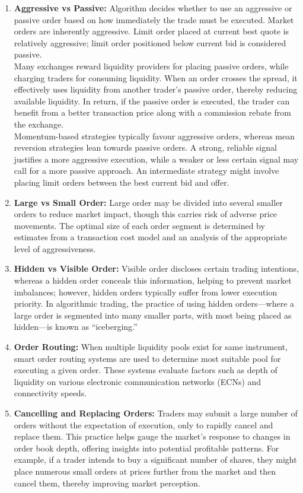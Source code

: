 \begin{remark} 
\begin{enumerate}[label=\roman*.] \setlength{\itemsep}{0pt}

\item \textbf{Aggressive vs Passive:} Algorithm decides whether to use an aggressive or passive order based on how immediately the trade must be executed. Market orders are inherently aggressive. Limit order placed at current best quote is relatively aggressive; limit order positioned below current bid is considered passive.\\
Many exchanges reward liquidity providers for placing passive orders, while charging traders for consuming liquidity. When an order crosses the spread, it effectively uses liquidity from another trader’s passive order, thereby reducing available liquidity. In return, if the passive order is executed, the trader can benefit from a better transaction price along with a commission rebate from the exchange.\\
Momentum-based strategies typically favour aggressive orders, whereas mean reversion strategies lean towards passive orders. A strong, reliable signal justifies a more aggressive execution, while a weaker or less certain signal may call for a more passive approach. An intermediate strategy might involve placing limit orders between the best current bid and offer.
\item \textbf{Large vs Small Order:} Large order may be divided into several smaller orders to reduce market impact, though this carries risk of adverse price movements. The optimal size of each order segment is determined by estimates from a transaction cost model and an analysis of the appropriate level of aggressiveness.
\item \textbf{Hidden vs Visible Order:} Visible order discloses certain trading intentions, whereas a hidden order conceals this information, helping to prevent market imbalances; however, hidden orders typically suffer from lower execution priority. In algorithmic trading, the practice of using hidden orders—where a large order is segmented into many smaller parts, with most being placed as hidden—is known as “iceberging.”
\item \textbf{Order Routing:} When multiple liquidity pools exist for same instrument, smart order routing systems are used to determine most suitable pool for executing a given order. These systems evaluate factors such as depth of liquidity on various electronic communication networks (ECNs) and connectivity speeds.
\item \textbf{Cancelling and Replacing Orders:} Traders may submit a large number of orders without the expectation of execution, only to rapidly cancel and replace them. This practice helps gauge the market’s response to changes in order book depth, offering insights into potential profitable patterns. For example, if a trader intends to buy a significant number of shares, they might place numerous small orders at prices further from the market and then cancel them, thereby improving market perception.
\end{enumerate}
\end{remark}

